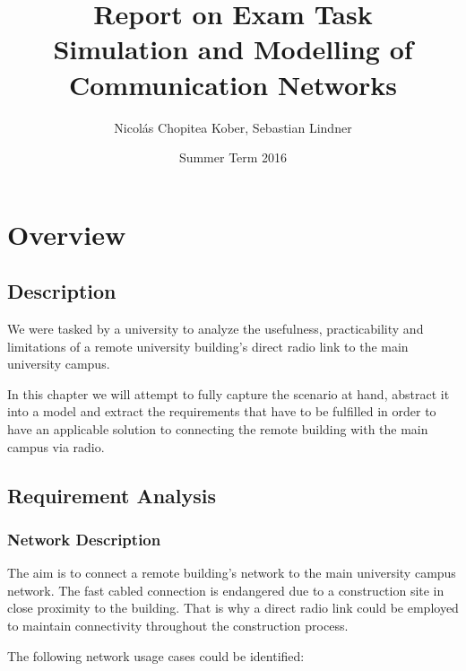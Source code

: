 \documentclass[a4paper]{scrreprt}
\begin{document}
\title{Report on Exam Task\\Simulation and Modelling of Communication Networks}
\author{Nicolás Chopitea Kober, Sebastian Lindner}
\date{Summer Term 2016}
\maketitle	

\tableofcontents
\newpage

\chapter{Overview}
\section{Description}
	We were tasked by a university to analyze the usefulness, practicability and limitations of a remote university building's direct radio link to the main university campus. 
	
	In this chapter we will attempt to fully capture the scenario at hand, abstract it into a model and extract the requirements that have to be fulfilled in order to have an applicable solution to connecting the remote building with the main campus via radio.
\section{Requirement Analysis}
	\subsection{Network Description}
		The aim is to connect a remote building's network to the main university campus network. The fast cabled connection is endangered due to a construction site in close proximity to the building. That is why a direct radio link could be employed to maintain connectivity throughout the construction process.
		
		The following network usage cases could be identified:
		
\end{document}
